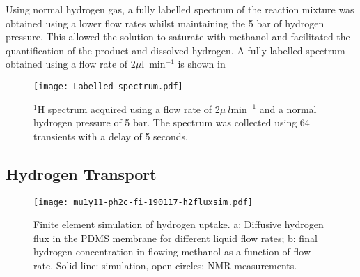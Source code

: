 Using normal hydrogen gas, a fully labelled spectrum of the reaction mixture
was obtained using a lower flow rates whilst maintaining
the 5 bar of hydrogen pressure. This allowed the solution to saturate with
methanol and facilitated the quantification of the product and dissolved hydrogen.
A fully labelled spectrum obtained using a flow rate of 2$\mu$l~$\text{min}^{-1}$
is shown in 

\begin{figure}
  \begin{center}
  \texttt{[image: Labelled-spectrum.pdf]}
  \end{center}
  \caption{$^1$H spectrum acquired using a flow rate of 2$\mu~l \text{min}^{-1}$
  and a normal hydrogen pressure of 5 bar. The spectrum was collected using 64 transients
  with a delay of 5 seconds.}
  \label{fig:LabelledSpec}
\end{figure}

\newpage

\subsection{Hydrogen Transport}

\begin{figure}
  \begin{center}
	\texttt{[image: mu1y11-ph2c-fi-190117-h2fluxsim.pdf]}
  \end{center}
	\caption{
		Finite element simulation of hydrogen uptake. a: Diffusive hydrogen
		flux in the PDMS membrane for different liquid flow rates;
		b: final hydrogen concentration in flowing methanol as a function of
		flow rate. Solid line: simulation, open circles: NMR measurements.
	}
	\label{fig:h2fluxsim}
\end{figure}

